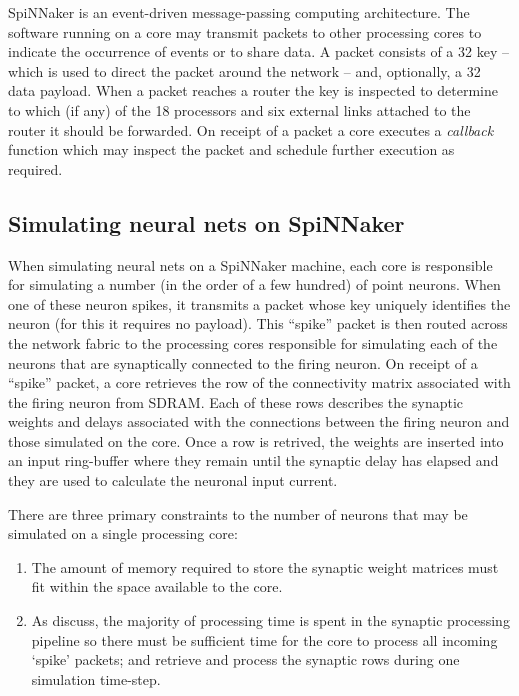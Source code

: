 \documentclass[conference]{IEEEtran}
\begin{document}
SpiNNaker is an event-driven message-passing computing architecture. The software running on a core may transmit packets to other processing cores to indicate the occurrence of events or to share data. A packet consists of a \SI{32}{\bit} key -- which is used to direct the packet around the network -- and, optionally, a \SI{32}{\bit} data payload. When a packet reaches a router the key is inspected to determine to which (if any) of the 18 processors and six external links attached to the router it should be forwarded. On receipt of a packet a core executes a \textit{callback} function which may inspect the packet and schedule further execution as required.

  \subsection{Simulating neural nets on SpiNNaker}
  \label{sef:background/nn}

When simulating neural nets on a SpiNNaker machine, each core is responsible for simulating a number (in the order of a few hundred) of point neurons. When one of these neuron spikes, it transmits a packet whose key uniquely identifies the neuron (for this it requires no payload). This ``spike'' packet is then routed across the network fabric to the processing cores responsible for simulating each of the neurons that are synaptically connected to the firing neuron. On receipt of a ``spike'' packet, a core retrieves the row of the connectivity matrix associated with the firing neuron from SDRAM. Each of these rows describes the synaptic weights and delays associated with the connections between the firing neuron and those simulated on the core. Once a row is retrived, the weights are inserted into an input ring-buffer where they remain until the synaptic delay has elapsed and they are used to calculate the neuronal input current.

There are three primary constraints to the number of neurons that may be simulated on a single processing core:

  \begin{enumerate}
    \item The amount of memory required to store the synaptic weight matrices must fit within the space available to the core.
    \item As \textcite{Sharp2013} discuss, the majority of processing time is spent in the synaptic processing pipeline so there must be sufficient time for the core to process all incoming `spike' packets; and retrieve and process the synaptic rows during one simulation time-step.
  \end{enumerate}
\end{document}
